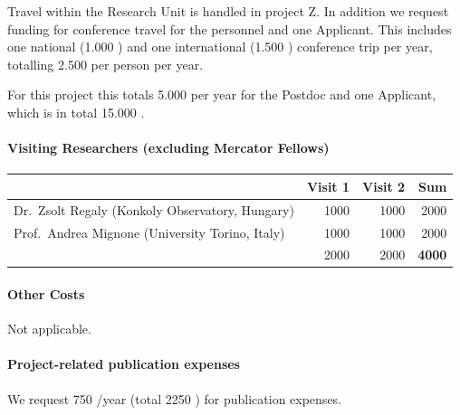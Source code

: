 \documentclass[10pt,fleqn,twoside]{article}
\begin{document}
Travel within the Research Unit is handled in project Z. In addition we
request funding for conference travel for the personnel and one Applicant.
This includes one national (1.000 \EUR{}) and one international (1.500 \EUR{})
conference trip per year, totalling 2.500 \EUR{} per person per year. 

For this project this totals 5.000 \EUR{} per year for the Postdoc
and one Applicant, which is in total 15.000 \EUR{}.


\paragraph{Visiting Researchers (excluding Mercator Fellows)}

\begin{center}
\begin{tabular}{l|r|r|r}
& Visit 1 & Visit 2 & Sum \\
\hline\hline
Dr.\ Zsolt Regaly (Konkoly Observatory, Hungary)  & 1000 & 1000 & 2000 \\
Prof.\ Andrea Mignone (University Torino, Italy)  & 1000 & 1000 & 2000 \\
\hline
  & 2000 & 2000 & {\bf 4000}\\
\end{tabular}
\end{center}

\paragraph{Other Costs}

Not applicable.

\paragraph{Project-related publication expenses}
We request 750 \EUR{}/year (total 2250 \EUR{}) for publication expenses.
\end{document}
